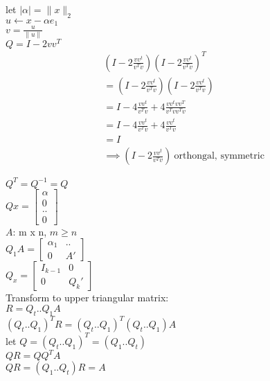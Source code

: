 \documentclass[8pt,letter]{article}
\begin{document}
\begin{multicols*}{2}
    let $| \alpha | = \|x\|_2$\\
    $u \leftarrow x - \alpha e_1$\\
    $v = \frac{u}{\|u\|}$\\
    $Q = I - 2 vv^T$
    \begin{align*}
      & (I - 2 \frac{vv^t}{v^Tv}) (I - 2 \frac{vv^t}{v^Tv})^T\\
      & = (I - 2 \frac{vv^t}{v^Tv}) (I - 2 \frac{vv^t}{v^Tv})\\    
      & = I - 4 \frac{vv^t}{v^Tv} + 4 \frac{vv^t vv^T}{v^Tv v^Tv}\\
      & = I - 4 \frac{vv^t}{v^Tv} + 4 \frac{vv^t}{v^Tv}\\
      & = I\\
      & \implies (I - 2 \frac{vv^t}{v^Tv})\ \text{orthongal, symmetric}
    \end{align*}
    
    $Q^T = Q^{-1} = Q$\\
    
    $Qx = \begin{bmatrix} \alpha \\ 0 \\ ..\\ 0 \end{bmatrix}$\\

    $A$: m x n, $m \geq n$\\
    
    $ Q_1 A =
    \begin{bmatrix}
      \alpha_1 & .. \\
      0 & A'
    \end{bmatrix}$\\

    $ Q_x =
    \begin{bmatrix}
      I_{k-1} & 0 \\
      0 & Q_k'
    \end{bmatrix}$\\    

    Transform to upper triangular matrix:\\
    $R = Q_t .. Q_1 A$\\
    $(Q_t .. Q_1)^T R = (Q_t .. Q_1)^T (Q_t .. Q_1) A$\\
    let $Q = (Q_t .. Q_1)^T = (Q_1 .. Q_t)$\\
    $Q R = Q Q^T A$\\
    $QR = (Q_1 .. Q_t) R = A$\\


\end{multicols*}
\end{document}
